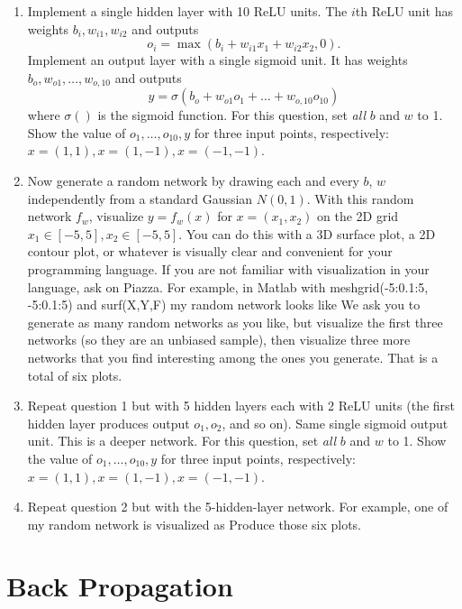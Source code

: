 \documentclass[a4paper]{article}
\theoremstyle{definition}
\begin{document}
\begin{enumerate}
\item Implement a single hidden layer with 10 ReLU units.
The $i$th ReLU unit has weights $b_i, w_{i1}, w_{i2}$ and outputs 
$$o_i =\max( b_i + w_{i1} x_1 + w_{i2} x_2, 0).$$
Implement an output layer with a single sigmoid unit.
It has weights $b_o, w_{o1}, \ldots, w_{o,10}$ and outputs
$$y =\sigma( b_o + w_{o1} o_1 + \ldots + w_{o,10} o_{10})$$
where $\sigma()$ is the sigmoid function.
For this question, set \emph{all} $b$ and $w$ to 1.
Show the value of $o_1, \ldots, o_{10}, y$ for three input points, respectively: $x=(1,1), x=(1, -1), x=(-1,-1)$.

\item Now generate a random network by drawing each and every $b$, $w$ independently from a standard Gaussian $N(0,1)$.
With this random network $f_w$, visualize $y=f_w(x)$ for $x=(x_1,x_2)$ on the 2D grid $x_1 \in [-5,5], x_2 \in [-5, 5]$.
You can do this with a 3D surface plot, a 2D contour plot, or whatever is visually clear and convenient for your programming language.
If you are not familiar with visualization in your language, ask on Piazza.
For example, in Matlab with meshgrid(-5:0.1:5, -5:0.1:5) and surf(X,Y,F) my random network looks like
We ask you to generate as many random networks as you like, but visualize the first three networks (so they are an unbiased sample), then visualize three more networks that you find interesting among the ones you generate.
That is a total of six plots.

\item Repeat question 1 but with 5 hidden layers each with 2 ReLU units (the first hidden layer produces output $o_1, o_2$, and so on).  Same single sigmoid output unit.  This is a deeper network.
For this question, set \emph{all} $b$ and $w$ to 1.
Show the value of $o_1, \ldots, o_{10}, y$ for three input points, respectively: $x=(1,1), x=(1, -1), x=(-1,-1)$.

\item Repeat question 2 but with the 5-hidden-layer network.
For example, one of my random network is visualized as
Produce those six plots.


\end{enumerate}

\section{Back Propagation}
\end{document}
